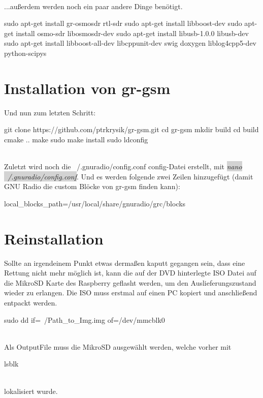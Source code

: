 \noindent\\...außerdem werden noch ein paar andere Dinge benötigt.

\begin{code}[numbers=left, stepnumber=1]
sudo apt-get install gr-osmosdr rtl-sdr
sudo apt-get install libboost-dev
sudo apt-get install osmo-sdr libosmosdr-dev
sudo apt-get install libusb-1.0.0 libusb-dev
sudo apt-get install libboost-all-dev libcppunit-dev swig doxygen liblog4cpp5-dev python-scipys
\end{code}

\newpage 
\section{Installation von gr-gsm}

Und nun zum letzten Schritt:

\begin{code}[numbers=left, stepnumber=1]
git clone https://github.com/ptrkrysik/gr-gsm.git
cd gr-gsm
mkdir build
cd build
cmake ..
make
sudo make install
sudo ldconfig
\end{code}

\noindent\\Zuletzt wird noch die ~/.gnuradio/config.conf config-Datei erstellt, mit \colorbox{lightgray}{\emph{nano ~/.gnuradio/config.conf}}. Und es werden folgende zwei Zeilen hinzugefügt (damit GNU Radio die custom Blöcke von gr-gsm finden kann):

\begin{code}
[grc]
local_blocks_path=/usr/local/share/gnuradio/grc/blocks
\end{code}

\section{Reinstallation}
Sollte an irgendeinem Punkt etwas dermaßen kaputt gegangen sein, dass eine Rettung nicht mehr möglich ist, kann die auf der DVD hinterlegte ISO Datei auf die MikroSD Karte des Raspberry geflasht werden, um den Auslieferungszustand wieder zu erlangen. Die ISO muss erstmal auf einen PC kopiert und anschließend entpackt werden.
\begin{code}
sudo dd if=~/Path_to_Img.img of=/dev/mmcblk0 
\end{code}
\noindent\\Als OutputFile muss die MikroSD ausgewählt werden, welche vorher mit 
\begin{code}
lsblk
\end{code}
\noindent\\lokalisiert wurde.